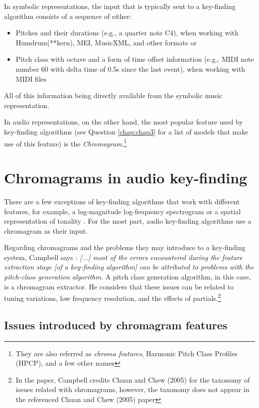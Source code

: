 In symbolic representations, the input that is typically sent to a key-finding algorithm consists of a sequence of either: 
\begin{itemize}
    \item Pitches and their durations (e.g., a quarter note C4), when working with Humdrum(**kern), MEI, MusicXML, and other formats or
    \item Pitch class with octave and a form of time offset information (e.g., MIDI note number 60 with delta time of 0.5s since the last event), when working with MIDI files
\end{itemize}
 All of this information being directly available from the symbolic music representation.

In audio representations, on the other hand, the most popular feature used by key-finding algorithms (see Question \ref{chap:chap3} for a list of models that make use of this feature) is the \emph{Chromagram}.\footnote{They are also referred as \emph{chroma features}, Harmonic Pitch Class Profiles (HPCP), and a few other names}

\section{Chromagrams in audio key-finding}

There are a few exceptions of key-finding algorithms that work with different features, for example, a log-magnitude log-frequency spectrogram \cite{korzeniowski2018genreagnostic} or a spatial representation of tonality \cite{arndt2008circular, harte2006detecting, lee2007unified}. For the most part, audio key-finding algorithms use a chromagram as their input.

Regarding chromagrams and the problems they may introduce to a key-finding system, Campbell says \cite{campbell2010automatic}: \emph{[...] most of the errors encountered during the feature extraction stage [of a key-finding algorithm] can be attributed to problems with the pitch-class generation algorithm.} A pitch class generation algorithm, in this case, is a chromagram extractor. He considers that these issues can be related to tuning variations, low frequency resolution, and the effects of partials.\footnote{In the paper, Campbell credits Chuan and Chew (2005) for the taxonomy of issues related with chromagrams, however, the taxonomy does not appear in the referenced Chuan and Chew (2005) paper}

\subsection{Issues introduced by chromagram features}

